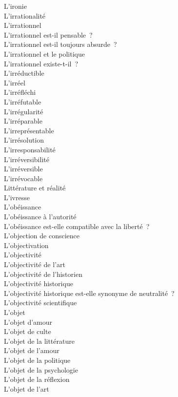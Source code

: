 \documentclass[a4paper,12pt]{article}
\begin{document}
L'ironie \\
L'irrationalité \\
L'irrationnel \\
L'irrationnel est-il pensable ? \\
L'irrationnel est-il toujours absurde ? \\
L'irrationnel et le politique \\
L'irrationnel existe-t-il ? \\
L'irréductible \\
L'irréel \\
L'irréfléchi \\
L'irréfutable \\
L'irrégularité \\
L'irréparable \\
L'irreprésentable \\
L'irrésolution \\
L'irresponsabilité \\
L'irréversibilité \\
L'irréversible \\
L'irrévocable \\
Littérature et réalité \\
L'ivresse \\
L'obéissance \\
L'obéissance à l'autorité \\
L'obéissance est-elle compatible avec la liberté ? \\
L'objection de conscience \\
L'objectivation \\
L'objectivité \\
L'objectivité de l'art \\
L'objectivité de l'historien \\
L'objectivité historique \\
L'objectivité historique est-elle synonyme de neutralité ? \\
L'objectivité scientifique \\
L'objet \\
L'objet d'amour \\
L'objet de culte \\
L'objet de la littérature \\
L'objet de l'amour \\
L'objet de la politique \\
L'objet de la psychologie \\
L'objet de la réflexion \\
L'objet de l'art \\
\end{document}
